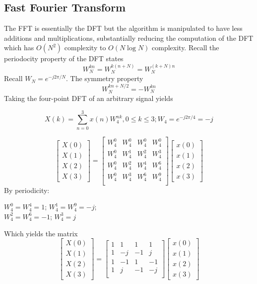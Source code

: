 \documentclass{article}
\begin{document}
\subsection{Fast Fourier Transform}
The FFT is essentially the DFT but the algorithm is manipulated to have less additions and multiplications, substantially reducing the computation of the DFT which has $O(N^2)$ complexity to $O(N\log N)$ complexity. Recall the periodocity property of the DFT states 
\begin{equation}
W_N^{kn}=W_N^{k(n+N)}=W_N^{(k+N)n}
\end{equation}
Recall $W_N=e^{-j2\pi/N}$. The symmetry property 
\begin{equation}
W_N^{kn+N/2}=-W_N^{kn}
\end{equation}
Taking the four-point DFT of an arbitrary signal yields 
\begin{center}
$$X(k)=\sum_{n=0}^{3}x(n)W_4^{nk},0 \leq k \leq 3;W_4=e^{-j2\pi/4}=-j$$
\end{center}
\[
\begin{bmatrix}
   X(0) \\
    X(1)  \\
    X(2)\\
    X(3)   
\end{bmatrix}=
\begin{bmatrix}
    W_4^0 & W_4^0  & W_4^0 & W_4^0  \\
   W_4^0 & W_4^1  & W_4^2 & W_4^3  \\
   W_4^0 & W_4^2  & W_4^4 & W_4^6  \\
   W_4^0 & W_4^3  & W_4^6 & W_4^9  \\
\end{bmatrix}
\begin{bmatrix}
    x(0) \\
    x(1)  \\
    x(2)\\
    x(3)   
\end{bmatrix}
\]
By periodicity: 
\begin{center}
$W_4^0=W_4^4=1$; \space \space $W_4^1=W_4^9=-j$; \\
\vspace{1em}
$W_4^2=W_4^6=-1$; \space \space $W_4^3=j$
\end{center}
Which yields the matrix
\[
\begin{bmatrix}
   X(0) \\
    X(1)  \\
    X(2)\\
    X(3)   
\end{bmatrix}=
\begin{bmatrix}
    1 & 1 & 1 & 1  \\
   1 & -j  & -1 & j  \\
   1& -1  & 1 & -1  \\
   1 & j  & -1 & -j  \\
\end{bmatrix}
\begin{bmatrix}
    x(0) \\
    x(1)  \\
    x(2)\\
    x(3)   
\end{bmatrix}
\]
\end{document}
